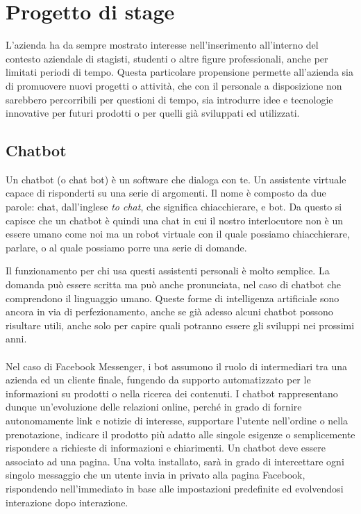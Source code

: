 
\chapter{Progetto di stage}
\label{cap:progetto-stage}

L'azienda \azienda{} ha da sempre mostrato interesse nell'inserimento all'interno del contesto aziendale di stagisti, studenti o altre figure professionali, anche per limitati periodi di tempo. Questa particolare propensione permette all'azienda sia di promuovere nuovi progetti o attività, che con il personale a disposizione non sarebbero percorribili per questioni di tempo, sia introdurre idee e tecnologie innovative per futuri prodotti o per quelli già sviluppati ed utilizzati.

\section{Chatbot}
Un \gls{chatbot} (o chat bot) è un software che dialoga con te. Un assistente virtuale capace di risponderti su una serie di argomenti. Il nome è composto da due parole: chat, dall’inglese \emph{to chat}, che significa chiacchierare, e bot. Da questo si capisce che un \gls{chatbot} è quindi una chat in cui il nostro interlocutore non è un essere umano come noi ma un robot virtuale con il quale possiamo chiacchierare, parlare, o al quale possiamo porre una serie di domande.

Il funzionamento per chi usa questi assistenti personali è molto semplice. La domanda può essere scritta ma può anche pronunciata, nel caso di \gls{chatbot} che comprendono il linguaggio umano. Queste forme di intelligenza artificiale sono ancora in via di perfezionamento, anche se già adesso alcuni \gls{chatbot} possono risultare utili, anche solo per capire quali potranno essere gli sviluppi nei prossimi anni.\\ \\
Nel caso di Facebook Messenger, i bot assumono il ruolo di intermediari tra una azienda ed un cliente finale, fungendo da supporto automatizzato per le informazioni su prodotti o nella ricerca dei contenuti. I \gls{chatbot} rappresentano dunque un’evoluzione delle relazioni online, perché in grado di fornire autonomamente link e notizie di interesse, supportare l’utente nell’ordine o nella prenotazione, indicare il prodotto più adatto alle singole esigenze o semplicemente rispondere a richieste di informazioni e chiarimenti. 
Un \gls{chatbot} deve essere associato ad una pagina. Una volta installato, sarà in grado di intercettare ogni singolo messaggio che un utente invia in privato alla pagina Facebook, rispondendo nell’immediato in base alle impostazioni predefinite ed evolvendosi interazione dopo interazione.

